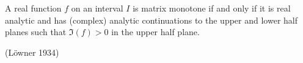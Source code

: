 \documentclass[12pt]{article}
\begin{document}
A real function $f$ on an
interval $I$ is matrix monotone if and only if it is real
analytic and has (complex) analytic continuations to the upper
and lower half planes such that $\Im(f)>0$ in the upper half plane.

\noindent
(L\"owner 1934)
\end{document}
